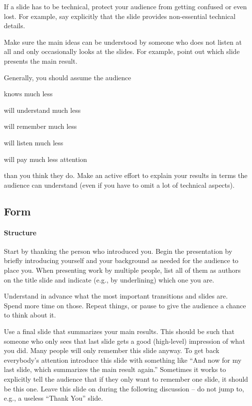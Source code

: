 \documentclass[12pt]{article}
\begin{document}
If a slide has to be technical, protect your audience from getting confused or even lost.
For example, say explicitly that the slide provides non-essential technical details.
\medskip

Make sure the main ideas can be understood by someone who does not listen at all and only occasionally looks at the slides.
For example, point out which slide presents the main result.
\medskip

Generally, you should assume the audience
\begin{compactitem}
\item knows much less
\item will understand much less
\item will remember much less
\item will listen much less
\item will pay much less attention
\end{compactitem}
than you think they do.
Make an active effort to explain your results in terms the audience can understand (even if you have to omit a lot of technical aspects).
\medskip

\subsection{Form}

\paragraph{Structure}
Start by thanking the person who introduced you.
Begin the presentation by briefly introducing yourself and your background as needed for the audience to place you.
When presenting work by multiple people, list all of them as authors on the title slide and indicate (e.g., by underlining) which one you are.
\medskip

Understand in advance what the most important transitions and slides are.
Spend more time on those.
Repeat things, or pause to give the audience a chance to think about it.
\medskip

Use a final slide that summarizes your main results.
This should be such that someone who only sees that last slide gets a good (high-level) impression of what you did.
Many people will only remember this slide anyway.
To get back everybody's attention introduce this slide with something like ``And now for my last slide, which summarizes the main result again.''
Sometimes it works to explicitly tell the audience that if they only want to remember one slide, it should be this one.
Leave this slide on during the following discussion -- do not jump to, e.g., a useless ``Thank You'' slide.
\end{document}
